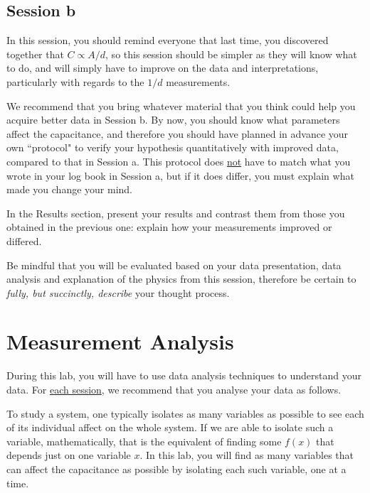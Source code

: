 \documentclass[12pt]{report}
\begin{document}
\subsection{Session b}

\begin{tcolorbox}[title=Session \#2]
In this session, you should remind everyone that last time, you discovered together that $C \propto A/d$, so this session should be simpler as they will know what to do, and will simply have to improve on the data and interpretations, particularly with regards to the $1/d$ measurements.
\end{tcolorbox}

We recommend that you bring whatever material that you think could help you acquire better data in Session b. 
By now, you should know what parameters affect the capacitance, and therefore you should have planned in advance your own ``protocol" to verify your hypothesis quantitatively with improved data, compared to that in Session a. 
This protocol does \underline{not} have to match what you wrote in your log book in Session a, but if it does differ, you must explain what made you change your mind.

{\color{blue} In the Results section, present your results and contrast  them from those you obtained in the previous one: explain how your measurements improved or differed.}

{\color{blue}Be mindful that you will be evaluated based on your data presentation, data analysis and explanation of the physics from this session, therefore be certain to \textit{fully, but succinctly, describe} your thought process.} 

\section{Measurement Analysis}
\label{Sec:lab1-analysis}
During this lab, you will have to use data analysis techniques to understand your data. For \underline{each session}, we recommend that you analyse your data as follows.

To study a system, one typically isolates as many variables as possible to see each of its individual affect on the whole system. If we are able to isolate such a variable, mathematically, that is the equivalent of finding some $f(x)$ that depends just on one variable $x$. In this lab, you will find as many variables that can affect the capacitance as possible by isolating each such variable, one at a time.
\end{document}
